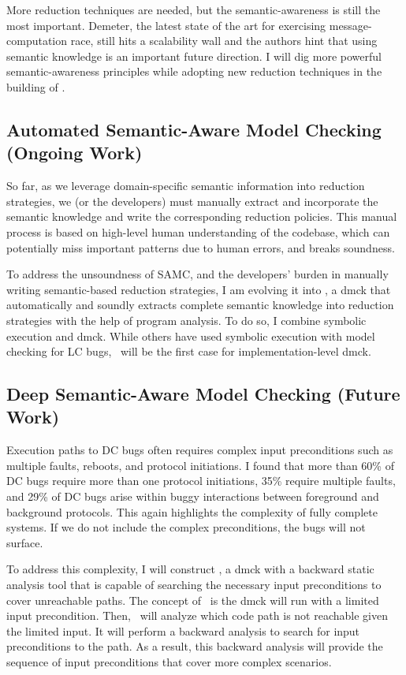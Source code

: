 \documentclass[11pt]{article}
\begin{document}
More reduction techniques are needed, but the semantic-awareness is still the
most important. Demeter, the latest state of the art for exercising
message-computation race, still hits a scalability wall and the authors hint
that using semantic knowledge is an important future direction. I will dig more
powerful semantic-awareness principles while adopting new reduction techniques
in the building of \fullcheck.


\subsection{Automated Semantic-Aware Model Checking (Ongoing Work)} 

So far, as we leverage domain-specific semantic information into reduction
strategies, we (or the developers) must manually extract and incorporate the
semantic knowledge and write the corresponding reduction policies. This manual
process is based on high-level human understanding of the codebase, which can
potentially miss important patterns due to human errors, and breaks soundness.

To address the unsoundness of SAMC, and the developers' burden in manually
writing semantic-based reduction strategies, I am evolving it into \autocheck,
a dmck that automatically and soundly extracts complete semantic knowledge into
reduction strategies with the help of program analysis.
%
To do so, I combine symbolic execution and dmck. While others have used symbolic
execution with model checking for LC bugs, \autocheck\ will be the first case for
implementation-level dmck. 

\subsection{Deep Semantic-Aware Model Checking (Future Work)}

Execution paths to DC bugs often requires complex input preconditions such as
multiple faults, reboots, and protocol initiations. I found that more than 60\%
of DC bugs require more than one protocol initiations, 35\% require multiple
faults, and 29\% of DC bugs arise within buggy interactions between foreground
and background protocols.  This again highlights the complexity of fully
complete systems. If we do not include the complex preconditions, the bugs will
not surface.

To address this complexity, I will construct \deepcheck, a dmck with a backward
static analysis tool that is capable of searching the necessary input
preconditions to cover unreachable paths. The concept of \deepcheck\ is the dmck
will run with a limited input precondition. Then, \deepcheck\ will analyze which
code path is not reachable given the limited input. It will perform a backward
analysis to search for input preconditions to the path. As a result, this
backward analysis will provide the sequence of input preconditions that cover
more complex scenarios.


\end{document}
